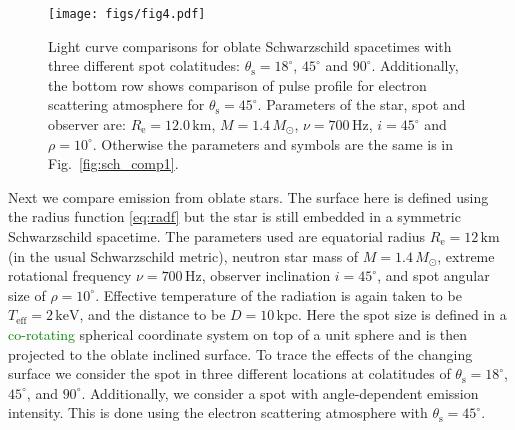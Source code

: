 \documentclass{aa}
\newcommand{\refe}[1]{\textcolor{green}{{#1}}}
\newcommand{\sch}{Schwarzschild }
\newcommand{\Msun}{\ensuremath{M_{\odot}}}
\begin{document}
\begin{figure}
\centering
\texttt{[image: figs/fig4.pdf]}
\caption{\label{fig:osch_comp700}
  Light curve comparisons for oblate \sch spacetimes with three different spot colatitudes: $\theta_{\mathrm{s}} = 18^{\circ}$, $45^{\circ}$ and $90^{\circ}$.
  Additionally, the bottom row shows comparison of pulse profile for electron scattering atmosphere for $\theta_{\mathrm{s}} = 45^{\circ}$.
  Parameters of the star, spot and observer are: $R_{\mathrm{e}} = 12.0\,\mathrm{km}$, $M = 1.4\,\Msun$, $\nu = 700\,\mathrm{Hz}$, $i = 45^{\circ}$ and $\rho = 10^{\circ}$.
  Otherwise the parameters and symbols are the same is in Fig.~\ref{fig:sch_comp1}.
  }
\end{figure}

Next we compare emission from oblate stars.
The surface here is defined using the radius function \eqref{eq:radf} but the star is still embedded in a symmetric \sch spacetime.
The parameters used are equatorial radius $R_{\mathrm{e}} = 12\,\mathrm{km}$ (in the usual \sch metric), neutron star mass of $M = 1.4\,\Msun$, extreme rotational frequency $\nu = 700\,\mathrm{Hz}$, observer inclination $i=45^{\circ}$, and spot angular size of $\rho = 10^{\circ}$.
Effective temperature of the radiation is again taken to be $T_{\mathrm{eff}} = 2\,\mathrm{keV}$, and the distance to be $D = 10\,\mathrm{kpc}$.
Here the spot size is defined in a \refe{co-rotating} spherical coordinate system on top of a unit sphere and is then projected to the oblate inclined surface.
To trace the effects of the changing surface we consider the spot in three different locations at colatitudes of $\theta_{\mathrm{s}} = 18^{\circ}$, $45^{\circ}$, and $90^{\circ}$.
Additionally, we consider a spot with angle-dependent emission intensity.
This is done using the electron scattering atmosphere with $\theta_{\mathrm{s}} = 45^{\circ}$.
\end{document}
